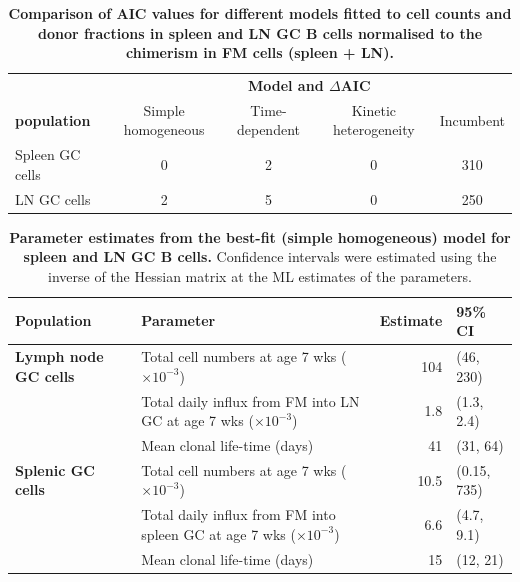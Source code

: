 \documentclass[11pt]{article}
\begin{document}
\begin{table}[h!]
	\begin{center}
		\renewcommand{\arraystretch}{1.25}
		\begin{tabular}{ l c c c c} 
			\toprule 
			& \multicolumn{4}{c}{\textbf{Model and $\Delta$AIC}} \\
			\cline{2-5}
			\textbf{population}  &  {\small Simple homogeneous}  & {\small Time-dependent} &  {\small Kinetic heterogeneity} & {\small Incumbent}  \\ 
			\toprule
			Spleen GC cells     & 0      &  2  & 0 & 310  \\ 
			LN GC cells         & 2      &  5  & 0 & 250   \\ 
			\hline
			\toprule 
		\end{tabular}
	\end{center}
	\caption{\small \textbf{Comparison of AIC values for different models fitted to cell counts and donor fractions in spleen and LN GC B cells normalised to the chimerism in FM cells (spleen + LN).}} 
\label{tab:GC-AICs}
\end{table} 

\begin{table}[h!]
	\begin{center}
		\renewcommand{\arraystretch}{1.25}
		\begin{tabular}{l l r l } 
			\toprule 
			\textbf{Population} & \textbf{Parameter}  &  {\small Estimate}  &  {\small 95\% CI} \\ 
			\toprule
			\textbf{Lymph node GC cells} & Total cell numbers at age 7 wks ($\times 10^{-3}$)      & 104      &  (46, 230)  \\ 
			& Total daily influx from FM into LN GC at age 7 wks ($\times 10^{-3}$)           &   1.8    &  (1.3, 2.4)  \\
			& Mean clonal life-time (days)      & 41     &  (31, 64)  \\ 
			\textbf{Splenic GC cells} & Total cell numbers at age 7 wks ($\times 10^{-3}$)      & 10.5      &  (0.15, 735)  \\ 
			& Total daily influx from FM into spleen GC at age 7 wks ($\times 10^{-3}$)           & 6.6      &  (4.7, 9.1)  \\
			& Mean clonal life-time (days)      & 15     &  (12, 21)  \\ 
			\hline
			\toprule 
		\end{tabular}
	\end{center}
	\caption{\small \textbf{Parameter estimates from the best-fit (simple homogeneous) model for spleen and LN GC B cells.}  Confidence intervals were estimated using the inverse of the Hessian matrix at the ML estimates of the parameters.}
	\label{tab:GC-parestm}
\end{table} 
\end{document}
